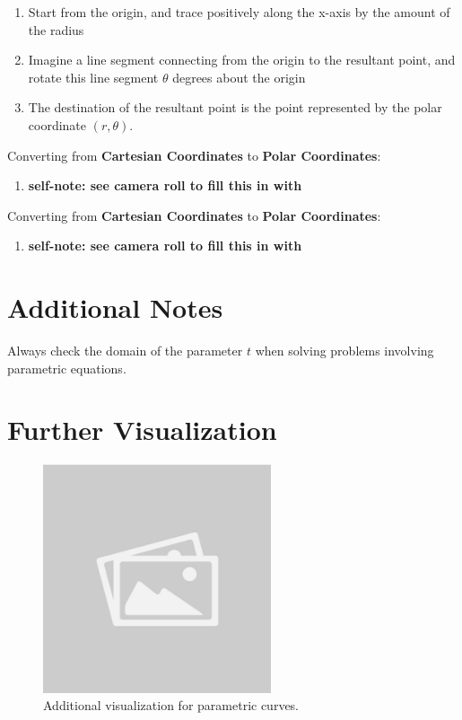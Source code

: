 \documentclass{article}
\begin{document}
\begin{definitionbox}
    \begin{enumerate}
        \item Start from the origin, and trace positively along the x-axis by the amount of the radius
        \item Imagine a line segment connecting from the origin to the resultant point, and rotate this line segment \( \theta \) degrees about the origin
        \item The destination of the resultant point is the point represented by the polar coordinate \( (r, \theta) \).
    \end{enumerate}
    Converting from \textbf{Cartesian Coordinates} to \textbf{Polar Coordinates}:
    \begin{enumerate}
        \item \textbf{self-note: see camera roll to fill this in with}
    \end{enumerate}
    Converting from \textbf{Cartesian Coordinates} to \textbf{Polar Coordinates}:
    \begin{enumerate}
        \item \textbf{self-note: see camera roll to fill this in with}
    \end{enumerate}
\end{definitionbox}

\section*{Additional Notes}
\begin{notebox}
Always check the domain of the parameter $t$ when solving problems involving parametric equations.
\end{notebox}

\section*{Further Visualization}
\begin{figure}[H]
    \centering
    \includegraphics[width=0.6\textwidth]{sample_image2.jpg}
    \caption{Additional visualization for parametric curves.}
    \label{fig:sample_image2}
\end{figure}
\end{document}
